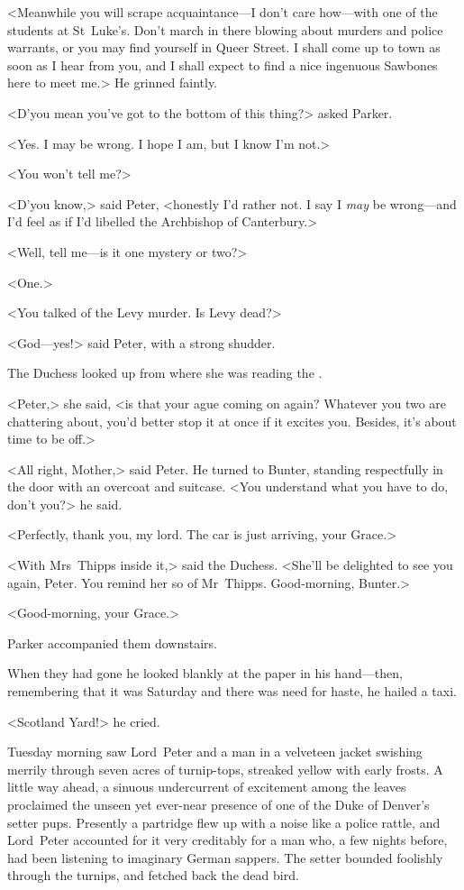 <Meanwhile you will scrape acquaintance—I don't care how—with one of the students at St~Luke's. Don't march in there blowing about murders and police warrants, or you may find yourself in Queer Street. I shall come up to town as soon as I hear from you, and I shall expect to find a nice ingenuous Sawbones here to meet me.> He grinned faintly.

<D'you mean you've got to the bottom of this thing?> asked Parker.

<Yes. I may be wrong. I hope I am, but I know I'm not.>

<You won't tell me?>

<D'you know,> said Peter, <honestly I'd rather not. I say I \emph{may} be wrong—and I'd feel as if I'd libelled the Archbishop of Canterbury.>

<Well, tell me—is it one mystery or two?>

<One.>

<You talked of the Levy murder. Is Levy dead?>

<God—yes!> said Peter, with a strong shudder.

The Duchess looked up from where she was reading the .

<Peter,> she said, <is that your ague coming on again? Whatever you two are chattering about, you'd better stop it at once if it excites you. Besides, it's about time to be off.>

<All right, Mother,> said Peter. He turned to Bunter, standing respectfully in the door with an overcoat and suitcase. <You understand what you have to do, don't you?> he said.

<Perfectly, thank you, my lord. The car is just arriving, your Grace.>

<With Mrs~Thipps inside it,> said the Duchess. <She'll be delighted to see you again, Peter. You remind her so of Mr~Thipps. Good-morning, Bunter.>

<Good-morning, your Grace.>

Parker accompanied them downstairs.

When they had gone he looked blankly at the paper in his hand—then, remembering that it was Saturday and there was need for haste, he hailed a taxi.

<Scotland Yard!> he cried.

Tuesday morning saw Lord~Peter and a man in a velveteen jacket swishing merrily through seven acres of turnip-tops, streaked yellow with early frosts. A little way ahead, a sinuous undercurrent of excitement among the leaves proclaimed the unseen yet ever-near presence of one of the Duke of Denver's setter pups. Presently a partridge flew up with a noise like a police rattle, and Lord~Peter accounted for it very creditably for a man who, a few nights before, had been listening to imaginary German sappers. The setter bounded foolishly through the turnips, and fetched back the dead bird.

